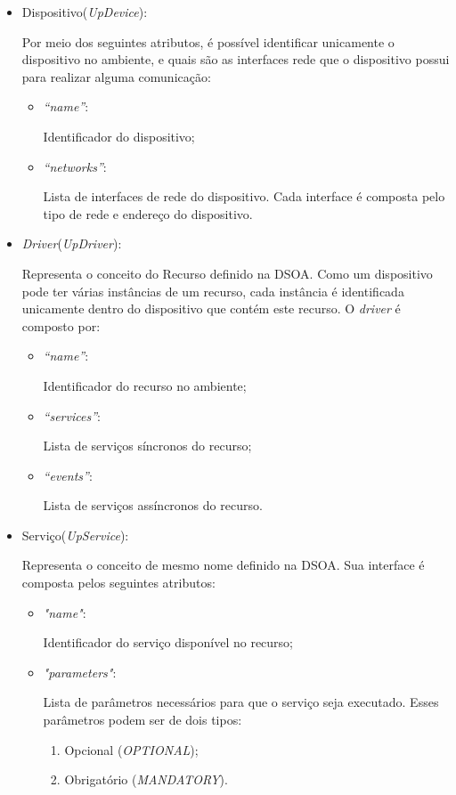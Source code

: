 \begin{itemize}
	\item Dispositivo(\emph{UpDevice}):
	
		Por meio dos seguintes atributos, é possível identificar unicamente o dispositivo no ambiente, e quais são as interfaces rede que o dispositivo possui para realizar alguma comunicação:
		\begin{itemize}
			\item \emph{``name''}: 
			
			Identificador do dispositivo;
			\item \emph{``networks''}: 

			Lista de interfaces de rede do dispositivo. Cada interface é composta pelo tipo de rede e endereço do dispositivo.
		\end{itemize}
	\item \emph{Driver}(\emph{UpDriver}): 

		Representa o conceito do Recurso definido na DSOA. Como um dispositivo pode ter várias instâncias de um recurso, cada instância é identificada unicamente dentro do dispositivo que contém este recurso. O \emph{driver} é composto por:
		\begin{itemize}
			\item \emph{``name''}:

				Identificador do recurso no ambiente;
			\item \emph{``services''}:
				
				Lista de serviços síncronos do recurso;
			\item \emph{``events''}:
				
				Lista de serviços assíncronos do recurso.
		\end{itemize}
	\item Serviço(\emph{UpService}): 

		Representa o conceito de mesmo nome definido na DSOA. Sua interface é composta pelos seguintes atributos:
		\begin{itemize}
			\item \emph{"name"}:

				Identificador do serviço disponível no recurso;
			\item \emph{"parameters"}:
				
				Lista de parâmetros necessários para que o serviço seja executado. Esses parâmetros podem ser de dois tipos:
				\begin{enumerate}
					\item Opcional (\emph{OPTIONAL});
					\item Obrigatório (\emph{MANDATORY}).
				\end{enumerate}
		\end{itemize}
\end{itemize}

